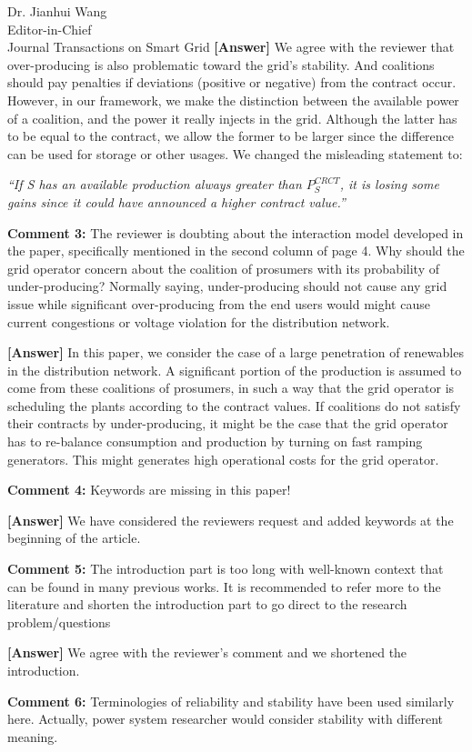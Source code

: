 \documentclass{letter}
\begin{document}
\begin{letter}{Dr. Jianhui Wang \\ Editor-in-Chief \\ Journal Transactions on Smart Grid }
\textbf{[Answer]} We agree with the reviewer that over-producing is also problematic toward the grid’s stability. And coalitions should pay penalties if deviations (positive or negative) from the contract occur. However, in our framework, we make the distinction between the available power of a coalition, and the power it really injects in the grid. Although the latter has to be equal to the contract, we allow the former to be larger since the difference can be used for storage or other usages. We changed the misleading statement to:

\textit{“If S has an available production always greater than $ P_{S}^{CRCT} $, it is losing some gains since it could have announced a higher contract value.”}


\textbf{Comment 3:} The reviewer is doubting about the interaction model developed in the paper, specifically mentioned in the second column of page 4. Why should the grid operator concern about the coalition of prosumers with its probability of under-producing? Normally saying, under-producing should not cause any grid issue while significant over-producing from the end users would might cause current congestions or voltage violation for the distribution network.


\textbf{[Answer]} In this paper, we consider the case of a large penetration of renewables in the distribution network. A significant portion of the production is assumed to come from these coalitions of prosumers, in such a way that the grid operator is scheduling the plants according to the contract values. If coalitions do not satisfy their contracts by under-producing, it might be the case that the grid operator has to re-balance consumption and production by turning on fast ramping generators. This might generates high operational costs for the grid operator.


\textbf{Comment 4:} Keywords are missing in this paper!


\textbf{[Answer]} We have considered the reviewers request and added keywords at the beginning of the article.


\textbf{Comment 5:} The introduction part is too long with well-known context that can be found in many previous works. It is recommended to refer more to the literature and shorten the introduction part to go direct to the research problem/questions


\textbf{[Answer]} We agree with the reviewer’s comment and we shortened the introduction.


\textbf{Comment 6:} Terminologies of reliability and stability have been used similarly here. Actually, power system researcher would consider stability with different meaning.



\end{letter}
\end{document}
